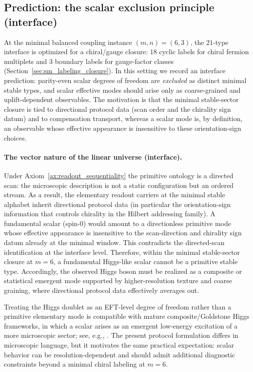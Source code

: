 \subsection{Prediction: the scalar exclusion principle (interface)}
\label{subsec:scalar_sectors_interface}

At the minimal balanced coupling instance $(m,n)=(6,3)$, the $21$-type interface is optimized for a chiral/gauge closure:
$18$ cyclic labels for chiral fermion multiplets and $3$ boundary labels for gauge-factor classes (Section~\ref{sec:sm_labeling_closure}).
In this setting we record an interface prediction:
parity-even scalar degrees of freedom are \emph{excluded} as distinct minimal stable types, and scalar effective modes should arise only as coarse-grained and uplift-dependent observables.
The motivation is that the minimal stable-sector closure is tied to directional protocol data (scan order and the chirality sign datum) and to compensation transport, whereas a scalar mode is, by definition, an observable whose effective appearance is insensitive to these orientation-sign choices.

\paragraph{The vector nature of the linear universe (interface).}
Under Axiom~\ref{ax:readout_sequentiality} the primitive ontology is a directed scan: the microscopic description is not a static configuration but an ordered stream.
As a result, the elementary readout carriers at the minimal stable alphabet inherit directional protocol data (in particular the orientation-sign information that controls chirality in the Hilbert addressing family).
A fundamental scalar (spin-$0$) would amount to a directionless primitive mode whose effective appearance is insensitive to the scan-direction and chirality sign datum already at the minimal window.
This contradicts the directed-scan identification at the interface level.
Therefore, within the minimal stable-sector closure at $m=6$, a fundamental Higgs-like scalar cannot be a primitive stable type.
Accordingly, the observed Higgs boson must be realized as a composite or statistical emergent mode supported by higher-resolution texture and coarse graining, where directional protocol data effectively averages out.

\begin{remark}\label{rem:composite_higgs_relation}
Treating the Higgs doublet as an EFT-level degree of freedom rather than a primitive elementary mode is compatible with mature composite/Goldstone Higgs frameworks, in which a scalar arises as an emergent low-energy excitation of a more microscopic sector; see, e.g., \cite{Contino2011TASICompositeHiggs,PanicoWulzer2016CompositeHiggs}.
The present protocol formulation differs in microscopic language, but it motivates the same practical expectation: scalar behavior can be resolution-dependent and should admit additional diagnostic constraints beyond a minimal chiral labeling at $m=6$.
\end{remark}

